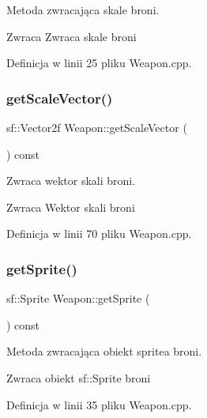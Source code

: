 Metoda zwracająca skale broni. 

\begin{DoxyReturn}{Zwraca}
Zwraca skale broni 
\end{DoxyReturn}


Definicja w linii 25 pliku Weapon.\+cpp.

\mbox{\label{class_weapon_a91adf453c2d656f577686b31d1f87e25}} 
\subsubsection{\texorpdfstring{get\+Scale\+Vector()}{getScaleVector()}}
{\footnotesize\ttfamily sf\+::\+Vector2f Weapon\+::get\+Scale\+Vector (\begin{DoxyParamCaption}{ }\end{DoxyParamCaption}) const}



Zwraca wektor skali broni. 

\begin{DoxyReturn}{Zwraca}
Wektor skali broni 
\end{DoxyReturn}


Definicja w linii 70 pliku Weapon.\+cpp.

\mbox{\label{class_weapon_a1da4c7c6528d560e2a183ecd6e65d27b}} 
\subsubsection{\texorpdfstring{get\+Sprite()}{getSprite()}}
{\footnotesize\ttfamily sf\+::\+Sprite Weapon\+::get\+Sprite (\begin{DoxyParamCaption}{ }\end{DoxyParamCaption}) const}



Metoda zwracająca obiekt sprite\textquotesingle{}a broni. 

\begin{DoxyReturn}{Zwraca}
obiekt sf\+::\+Sprite broni 
\end{DoxyReturn}


Definicja w linii 35 pliku Weapon.\+cpp.

\mbox{\label{class_weapon_aaf32c85f3e70d3c8392c928b9e6e75ca}} 
